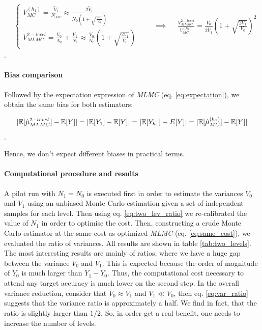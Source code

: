 \begin{align}\label{eq:var_ratio}
&
\begin{cases}
V_{MC}^{(h_1)} = \frac{\tilde{V}_1}{N_{MC}} \approx \frac{2\tilde{V}_1}{N_0 \left(1 + \sqrt{\frac{2V_1}{V_0}} \right)} & \\
V_{MLMC}^{2-level} = \frac{V_0}{N_0} + \frac{V_1}{N_1} \approx \frac{V_0}{N_0} \left(1 + \sqrt{\frac{2V_1}{V_0}} \right) &
\end{cases}
& & \implies & &
\frac{V_{MLMC}^{2-level}}{V_{MC}^{(h_1)}} = \frac{V_0}{2\tilde{V}_1} \left(1 + \sqrt{\frac{2V_1}{V_0}} \right)^2
\end{align}.

\paragraph{Bias comparison}
Followed by the expectation expression of \textit{MLMC} (eq. \ref{eq:expectation}), we obtain the same bias for both estimators:

\begin{equation}
|\mathbb{E}[\hat{\mu}_{MLMC}^{2-level}] - \mathbb{E}[Y]| = |\mathbb{E}[Y_1] - \mathbb{E}[Y]| = |\mathbb{E}[Y_{h_1}] - E[Y]| = |\mathbb{E}[\hat{\mu}_{MC}^{(h_1)}] - \mathbb{E}[Y]|
\end{equation}.

Hence, we don't expect different biases in practical terms.

\paragraph{Computational procedure and results}
A pilot run with $N_1 = N_0$ is executed first in order to estimate the variances $V_0$ and $V_1$ using an unbiased Monte Carlo estimation given a set of independent samples for each level. Then using eq. \ref{eq:two_lev_ratio} we re-calibrated the value of $N_1$ in order to optimise the cost.
Then, constructing a crude Monte Carlo estimator at the same cost as optimized \textit{MLMC} (eq. \ref{eq:same_cost}), we evaluated the ratio of variances.
All results are shown in table \ref{tab:two_levels}.
The most interesting results are mainly of ratios, where we have a huge gap between the variance $V_0$ and $V_1$. This is expected because the order of magnitude of $Y_0$ is much larger than $Y_1 - Y_0$. Thus, the computational cost necessary to attend any target accuracy is much lower on the second step. In the overall variance reduction, consider that $V_0 \approx \tilde{V_1}$ and $V_1 \ll V_0$, then eq. \ref{eq:var_ratio} suggests that the variance ratio is approximately a half. 
We find in fact, that the ratio is slightly larger than $1/2$. So, in order get a real benefit, one needs to increase the number of levels. 


